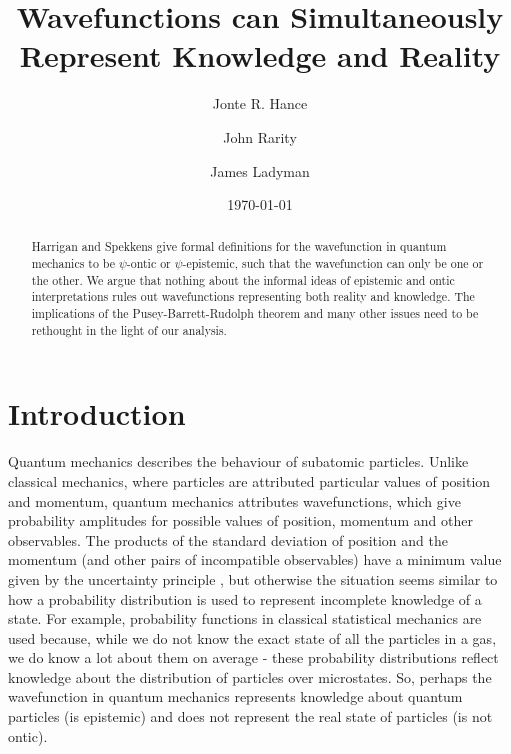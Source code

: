 \documentclass[superscriptaddress,reprint, floatfix, prl,nofootinbib]{revtex4-2}
\begin{document}
\title{Wavefunctions can Simultaneously Represent Knowledge and Reality}

\author{Jonte R. Hance}
\author{John Rarity}
\author{James Ladyman}
\date{\today}

\begin{abstract}

Harrigan and Spekkens give formal definitions for the wavefunction in quantum mechanics to be $\psi$-ontic or $\psi$-epistemic, such that the wavefunction can only be one or the other. We argue that nothing about the informal ideas of epistemic and ontic interpretations rules out wavefunctions representing both reality and knowledge. The implications of the Pusey-Barrett-Rudolph theorem and many other issues need to be rethought in the light of our analysis.

\end{abstract}

\maketitle

\section{Introduction}

Quantum mechanics describes the behaviour of subatomic particles. Unlike classical mechanics, where particles are attributed particular values of position and momentum, quantum mechanics attributes wavefunctions, which give probability amplitudes for possible values of position, momentum and other observables. The products of the standard deviation of position and the momentum (and other pairs of incompatible observables) have a minimum value given by the uncertainty principle \cite{Kennard1927Quantenmechanik}, but otherwise the situation seems similar to how a probability distribution is used to represent incomplete knowledge of a state. For example, probability functions in classical statistical mechanics are used because, while we do not know the exact state of all the particles in a gas, we do know a lot about them on average - these probability distributions reflect knowledge about the distribution of particles over microstates. So, perhaps the wavefunction in quantum mechanics represents knowledge about quantum particles (is epistemic) and does not represent the real state of particles (is not ontic).
\end{document}
